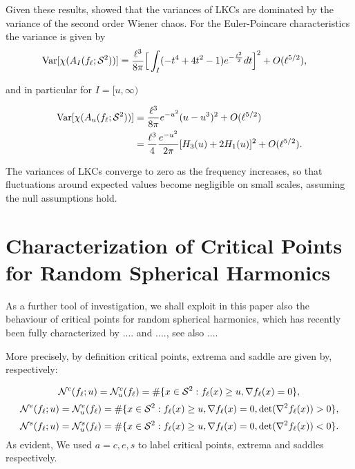 \documentclass[aps,prd,showpacs,superscriptaddress,groupedaddress]{revtex4-1}  %
\begin{document}
Given these results, \cite{cm1603} showed that the variances of LKCs
are dominated by the variance of the second order Wiener chaos. For
the Euler-Poincare characteristics the variance is given by
\begin{align*}
\text{Var}[\chi (A_{I}(f_{\ell }; {\cal S}^2) )]
&=\frac{\ell^3}{8 \pi } 
\Big[   \int_{I}  (-t^4+4 t^2 -1) e^{-\frac {t^2} 2 } d t \Big]^2+O(\ell^{5/2}),  
\end{align*}

\noindent and in particular for $I=[u,\infty)$

\begin{align*}
\text{Var}[\chi (A_{u}(f_{\ell }; {\cal S}^2) )]&= \frac{\ell^3}{8 \pi }  e^{- u^2  }   (u-u^3)^2  +O(\ell^{5/2})\\
&=\frac{\ell^3 }{4 } 
 \frac{e^{-u^2}}{2\pi} [H_3(u)+2H_1(u) ]^2  +O(\ell^{5/2}).
\end{align*}

The variances of LKCs converge to zero as the frequency increases,
so that fluctuations around expected values become negligible on
small scales, assuming the null assumptions hold. 

\section{Characterization of Critical Points for Random Spherical Harmonics}

As a further tool of investigation, we shall exploit in this paper also the behaviour of critical points for random spherical harmonics, which has recently been fully characterized by .... and ...., see also ....

More precisely, by definition critical points, extrema and saddle are given by, respectively:

\begin{equation*}
\mathcal{N}^{c}(f_\ell;u )=\mathcal{N}_{u}^{c}(f_{\ell })=\#\{x\in {\cal S}^2
:f_{\ell }(x)\geq u,\nabla f_{\ell }(x)=0\},
\end{equation*}
\begin{equation*}
\mathcal{N}^{e}(f_\ell;u)=\mathcal{N}_{u}^{e}(f_{\ell })=\#\{x\in {\cal S}^2
:f_{\ell }(x)\geq u,\nabla f_{\ell }(x)=0,\text{det}(\nabla ^{2}f_{\ell
}(x))>0\},
\end{equation*}
\begin{equation*}
\mathcal{N}^{s}(f_\ell;u)=\mathcal{N}_{u}^{s}(f_{\ell })=\#\{x\in {\cal S}^2
:f_{\ell }(x)\geq u,\nabla f_{\ell }(x)=0,\text{det}(\nabla ^{2}f_{\ell
}(x))<0\}.
\end{equation*}%
As evident, We used $a=c,e,s$ to label critical points, extrema and saddles respectively. \\
\end{document}
